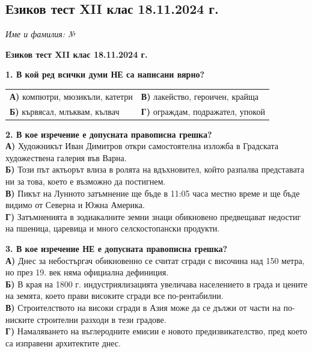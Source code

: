 \documentclass[12pt,a4paper]{article}
\begin{document}
\subsection{Езиков тест XII клас 18.11.2024 г.}

\noindent
\textit{Име и фамилия:} \dotfill \textit{№} \makebox[2cm]{\dotfill}

\vspace{0.6cm}

\begin{center}
\noindent
\textbf{Езиков тест XII клас 18.11.2024 г.}
\end{center}

\vspace{0.6cm}

\noindent
\textbf{1. В кой ред всички думи НЕ са написани вярно?} \\
\begin{tabular}{@{}p{} p{}@{}}
\textbf{А)} компютри, мюзикъли, катетри & \textbf{В)} лакейство, героичен, крайща \\
\textbf{Б)} кървясал, млъквам, кълвач & \textbf{Г)} ограждам, подражател, упокой
\end{tabular}

\vspace{0.6cm}

\noindent
\textbf{2. В кое изречение е допусната правописна грешка?} \\
\textbf{А)} Художникът Иван Димитров откри самостоятелна изложба в Градската художествена галерия във Варна. \\
\textbf{Б)} Този път актьорът влиза в ролята на вдъхновител, който разпалва представата ни за това, което е възможно да постигнем. \\
\textbf{В)} Пикът на Лунното затъмнение ще бъде в 11:05 часа местно време и ще бъде видимо от Северна и Южна Америка. \\
\textbf{Г)} Затъмненията в зодиакалните земни знаци обикновено предвещават недостиг на пшеница, царевица и много селскостопански продукти.

\vspace{0.6cm}

\noindent
\textbf{3. В кое изречение НЕ е допусната правописна грешка?} \\
\textbf{А)} Днес за небостъргач обикновенно се считат сгради с височина над 150 метра, но през 19. век няма официална дефиниция. \\
\textbf{Б)} В края на 1800 г. индустриялизацията увеличава населението в града и цените на земята, което прави високите сгради все по-рентабилни. \\
\textbf{В)} Строителството на високи сгради в Азия може да се дължи от части на по-ниските строителни разходи в тези градове. \\
\textbf{Г)} Намаляването на въглеродните емисии е новото предизвикателство, пред което са изправени архитектите днес.
\end{document}
